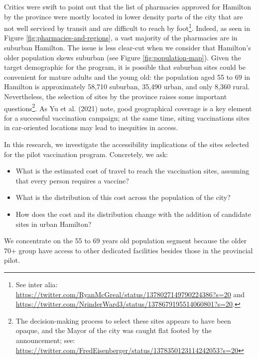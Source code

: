 \documentclass[]{elsarticle} %
\providecommand{\tightlist}{%
  \setlength{\itemsep}{0pt}\setlength{\parskip}{0pt}}
\begin{document}
Critics were swift to point out that the list of pharmacies approved for
Hamilton by the province were mostly located in lower density parts of
the city that are not well serviced by transit and are difficult to
reach by
foot\footnote{See inter alia: \url{https://twitter.com/RyanMcGreal/status/1378027149790224386?s=20} and \url{https://twitter.com/NrinderWard3/status/1378679195514060801?s=20}.}.
Indeed, as seen in Figure \ref{fig:pharmacies-and-regions}, a vast
majority of the pharmacies are in suburban Hamilton. The issue is less
clear-cut when we consider that Hamilton's older population skews
suburban (see Figure \ref{fig:population-map}). Given the target
demographic for the program, it is possible that suburban sites could be
convenient for mature adults and the young old: the population aged 55
to 69 in Hamilton is approximately 58,710 suburban, 35,490 urban, and
only 8,360 rural. Nevertheless, the selection of sites by the province
raises some important
questions\footnote{The decision-making process to select these sites appears to have been opaque, and the Mayor of the city was caught flat footed by the announcement; see: \url{https://twitter.com/FredEisenberger/status/1378350123114242053?s=20}}.
As Yu et al. (2021) note, good geographical coverage is a key element
for a successful vaccination campaign; at the same time, siting
vaccinations sites in car-oriented locations may lead to inequities in
access.

In this research, we investigate the accessibility implications of the
sites selected for the pilot vaccination program. Concretely, we ask:

\begin{itemize}
\tightlist
\item
  What is the estimated cost of travel to reach the vaccination sites,
  assuming that every person requires a vaccine?
\item
  What is the distribution of this cost across the population of the
  city?
\item
  How does the cost and its distribution change with the addition of
  candidate sites in urban Hamilton?
\end{itemize}

We concentrate on the 55 to 69 years old population segment because the
older 70+ group have access to other dedicated facilities besides those
in the provincial pilot.
\end{document}
